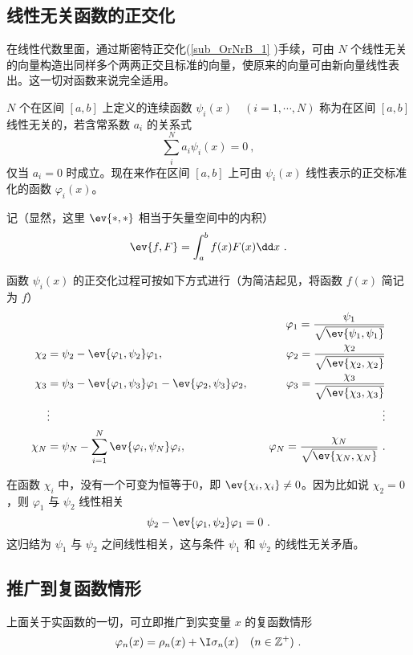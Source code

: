 \subsection{线性无关函数的正交化}
在线性代数里面，通过斯密特正交化(\autoref{sub_OrNrB_1} )手续，可由 $N$ 个线性无关的向量构造出同样多个两两正交且标准的向量，使原来的向量可由新向量线性表出。这一切对函数来说完全适用。

$N$ 个在区间 $[a,b]$ 上定义的连续函数 $\psi_i(x)\quad (i=1,\cdots ,N)$ 称为在区间 $[a,b]$ 线性无关的，若含常系数 $a_i$ 的关系式
\begin{equation}
\sum_i^N a_i\psi_i(x)=0~,
\end{equation}
仅当 $a_i=0$ 时成立。现在来作在区间 $[a,b]$ 上可由 ${\psi_i(x)}$ 线性表示的正交标准化的函数 ${\varphi_i(x)}$。

记（显然，这里 $\ev{*,*}$ 相当于矢量空间中的内积）
\begin{equation}
\ev{f,F}=\int_a^b f(x)F(x)\dd x~.
\end{equation}

函数 ${\psi_i(x)}$ 的正交化过程可按如下方式进行（为简洁起见，将函数 $f(x)$ 简记为 $f$）
\begin{equation}
\begin{aligned}
&&\varphi_1=\frac{\psi_1}{\sqrt{\ev{\psi_1,\psi_1}}}\\
\chi_2&=\psi_2-\ev{\varphi_1,\psi_2}\varphi_1,\quad&\varphi_2=\frac{\chi_2}{\sqrt{\ev{\chi_2,\chi_2}}}\\
\chi_3&=\psi_3-\ev{\varphi_1,\psi_3}\varphi_1-\ev{\varphi_2,\psi_3}\varphi_2,\quad &\varphi_3=\frac{\chi_3}{\sqrt{\ev{\chi_3,\chi_3}}}\\
&\vdots &\vdots
\\
\chi_N&=\psi_N-\sum_{i=1}^N\ev{\varphi_i,\psi_N}\varphi_i,\quad&\varphi_N=\frac{\chi_N}{\sqrt{\ev{\chi_N,\chi_N}}}~.
\end{aligned}
\end{equation}

在函数 $\chi_i$ 中，没有一个可变为恒等于0，即 $\ev{\chi_i,\chi_i}\neq 0$。因为比如说 $\chi_2=0$，则 $\varphi_1$ 与 $\psi_2$ 线性相关
\begin{equation}
\psi_2-\ev{\varphi_1,\psi_2}\varphi_1=0~.
\end{equation}
这归结为 $\psi_1$ 与 $\psi_2$ 之间线性相关，这与条件 $\psi_1$ 和 $\psi_2$ 的线性无关矛盾。
\subsection{推广到复函数情形}
上面关于实函数的一切，可立即推广到实变量 $x$ 的复函数情形
\begin{equation}
\varphi_n(x)=\rho_n(x)+\I \sigma_n(x)\quad(n\in \mathbb{Z}^+)~.
\end{equation}

